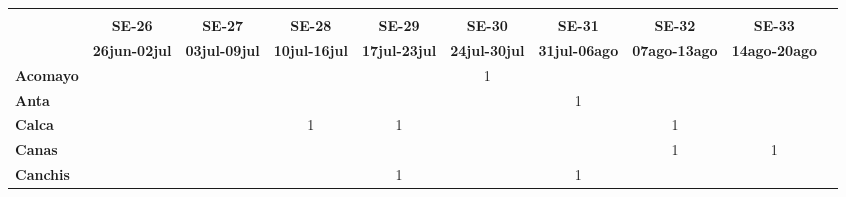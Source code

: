 \begin{tabular}{lccccccccc}
	\textbf{}              	  & \multicolumn{1}{l}{}                        & \multicolumn{1}{l}{}      & \multicolumn{1}{l}{}                         & \multicolumn{1}{l}{}                         & \multicolumn{1}{l}{}                         & \multicolumn{1}{l}{}                        & \multicolumn{1}{l}{}                         & \multicolumn{1}{l}{}     \\                   
	\textbf{}                                                                          		
	&\textbf{SE-26}								&\textbf{SE-27}								&\textbf{SE-28}								&\textbf{SE-29} 							&\textbf{SE-30}								&\textbf{SE-31} 							&\textbf{SE-32}								&\textbf{SE-33}\\							
	\textbf{}              	  		
	&\textbf{26jun-02jul}						&\textbf{03jul-09jul}
	&\textbf{10jul-16jul}						&\textbf{17jul-23jul}
	&\textbf{24jul-30jul}						&\textbf{31jul-06ago}
	&\textbf{07ago-13ago}						&\textbf{14ago-20ago}\\
	\textbf{Acomayo}                        		
	&\cellcolor[HTML]{FCC46C}					&\cellcolor[HTML]{FCC46C}
	&\cellcolor[HTML]{FCC46C}					&\cellcolor[HTML]{FCC46C}
	&1											&\cellcolor[HTML]{FCC46C}
	&\cellcolor[HTML]{FCC46C}					&\cellcolor[HTML]{FCC46C}\\
	\textbf{Anta}                                                   		
	&\cellcolor[HTML]{FCC46C} 					&\cellcolor[HTML]{FCC46C}					&\cellcolor[HTML]{FCC46C}					&\cellcolor[HTML]{FCC46C}					&\cellcolor[HTML]{FCC46C}					&1											&\cellcolor[HTML]{FCC46C}					&\cellcolor[HTML]{FCC46C}\\					
	\textbf{Calca}      				       								            
	&\cellcolor[HTML]{FCC46C}					&\cellcolor[HTML]{FCC46C}					&1				   							&1  										&\cellcolor[HTML]{FCC46C}	 	 	    	&\cellcolor[HTML]{FCC46C}					&1											&\cellcolor[HTML]{FCC46C}\\          			
	\textbf{Canas}                              											
	&\cellcolor[HTML]{FCC46C}					&\cellcolor[HTML]{FCC46C}
	&\cellcolor[HTML]{FCC46C} 					&\cellcolor[HTML]{FCC46C}
	&\cellcolor[HTML]{FCC46C}					&\cellcolor[HTML]{FCC46C}
	&1											&1\\	
	\textbf{Canchis}                             											
	&\cellcolor[HTML]{FCC46C}					&\cellcolor[HTML]{FCC46C}					&\cellcolor[HTML]{FCC46C}					&1											&\cellcolor[HTML]{FCC46C}					&1			
	&\cellcolor[HTML]{FCC46C}		&\cellcolor[HTML]{FCC46C}\\											

\end{tabular}
